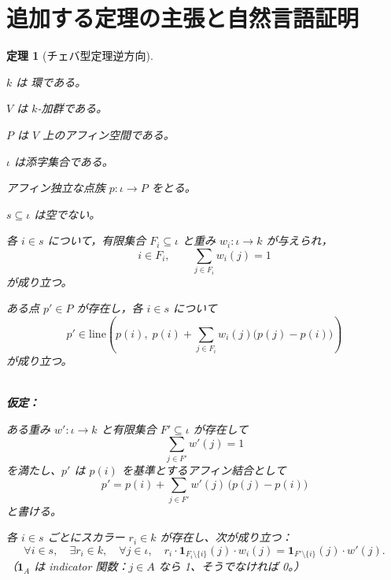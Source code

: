 \documentclass[a4paper,12pt]{bxjsbook}
\theoremstyle{theorem}
\newtheorem{theorem}{定理}[chapter]
\begin{document}
    \section{追加する定理の主張と自然言語証明}

    \begin{theorem}[チェバ型定理逆方向]
        \begin{theoremenumerate}[label=(P\arabic*), leftmargin=4em, topsep=2pt, partopsep=0pt,itemsep=0pt, parsep=0pt]
            \item $k$ は 環である。
            \item $V$ は $k$-加群である。
            \item $P$ は $V$ 上のアフィン空間である。
            \item $\iota$ は添字集合である。
            \item アフィン独立な点族 $p : \iota \to P$ をとる。
            \item $s \subseteq \iota$ は空でない。
            \item 各 $i\in s$ について，有限集合 $F_i\subseteq \iota$ と重み $w_i:\iota\to k$ が与えられ，
            \[
            i\in F_i,\qquad \sum_{j\in F_i} w_i(j)=1
            \]
            が成り立つ。
            \item ある点 $p'\in P$ が存在し，各 $i\in s$ について
            \[
            p' \in \mathrm{line}\!\left(
            p(i),\;
            p(i)+\sum_{j\in F_i} w_i(j)\bigl(p(j)-p(i)\bigr)
            \right)
            \]
            が成り立つ。
        \end{theoremenumerate}

        \noindent\textbf{\\仮定：}\par
        \begin{theoremenumerate}[label=(A\arabic*), leftmargin=4em, topsep=2pt, partopsep=0pt, itemsep=0pt, parsep=0pt]
            \item ある重み $w' : \iota \to k$ と有限集合 $F' \subseteq \iota$ が存在して
            \[
            \sum_{j \in F'} w'(j) = 1
            \]
            を満たし、$p'$ は $p(i)$ を基準とするアフィン結合として
            \[
            p' = p(i) + \sum_{j \in F'} w'(j)\,\bigl(p(j) - p(i)\bigr)
            \]
            と書ける。
            \item 各 $i \in s$ ごとにスカラー $r_i \in k$ が存在し、次が成り立つ：
            \[
            \forall i \in s, \quad \exists r_i \in k, \quad \forall j \in \iota, \quad r_i \cdot \mathbf{1}_{F_i \setminus \{i\}}(j) \cdot w_i(j) = \mathbf{1}_{F' \setminus \{i\}}(j) \cdot w'(j).
            \]
            （$\mathbf{1}_A$ は indicator 関数：$j \in A$ なら 1、そうでなければ 0。）
        \end{theoremenumerate}


\end{theorem}
\end{document}
